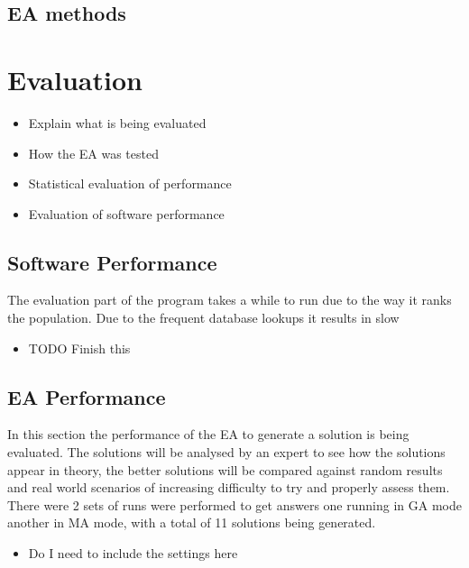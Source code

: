 \documentclass[a4paper]{article}
\begin{document}
\subsection{EA methods}


\section{Evaluation}
\begin{itemize}
	\item Explain what is being evaluated
	\item How the EA was tested
	\item Statistical evaluation of performance
	\item Evaluation of software performance
\end{itemize}
\subsection{Software Performance}
The evaluation part of the program takes a while to run due to the way it ranks the population.
Due to the frequent database lookups it results in slow
\begin{itemize}
	\item TODO Finish this
\end{itemize}
\subsection{EA Performance}
In this section the performance of the EA to generate a solution is being evaluated.
The solutions will be analysed by an expert to see how the solutions appear in theory, the better solutions will be compared against random results and real world scenarios of increasing difficulty to try and properly assess them.
There were 2 sets of runs were performed to get answers one running in GA mode another in MA mode, with a total of 11 solutions being generated.
\begin{itemize}
	\item Do I need to include the settings here
\end{itemize}
\end{document}
